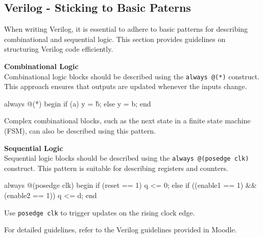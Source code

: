 \subsection{Verilog - Sticking to Basic Paterns}
When writing Verilog, it is essential to adhere to basic patterns for describing combinational and sequential logic. This section provides guidelines on structuring Verilog code efficiently.

\begin{center}
    \begin{minipage}{0.45\textwidth}
        \textbf{Combinational Logic} \vspace{0.5em} \\
        Combinational logic blocks should be described using the \texttt{always @(*)} construct. This approach ensures that outputs are updated whenever the inputs change.
        \begin{verilog}
always @(*) begin
    if (a) 
        y = \~b;
    else 
        y = b;
end
        \end{verilog}

        Complex combinational blocks, such as the next state in a finite state machine (FSM), can also be described using this pattern.
    \end{minipage}
    \hfill
    \vline
    \hfill
    \begin{minipage}{0.45\textwidth}
\textbf{Sequential Logic} \vspace{0.5em} \\
Sequential logic blocks should be described using the \texttt{always @(posedge clk)} construct. This pattern is suitable for describing registers and counters.

\begin{verilog}
always @(posedge clk) begin
    if (reset == 1) 
        q <= 0;
    else if ((enable1 == 1) && (enable2 == 1)) 
        q <= d;
end
        \end{verilog}

        Use \texttt{posedge clk} to trigger updates on the rising clock edge.
    \end{minipage}
\end{center}

For detailed guidelines, refer to the Verilog guidelines provided in Moodle.
